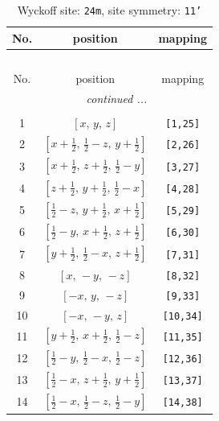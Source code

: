 \documentclass[fleqn,8pt]{jsarticle}
\begin{document}
\begin{longtable}{ccc}
\caption{Wyckoff site: {\tt 24m}, site symmetry: {\tt 11'}}
 \\
 \hline \hline
No. & position & mapping \\ \hline \endfirsthead

\multicolumn{2}{l}{\tablename\ \thetable{}} \\
 \hline \hline
No. & position & mapping \\ \hline \endhead

 \hline \hline
\multicolumn{2}{r}{\footnotesize\it continued ...} \\ \endfoot

 \hline \hline
\multicolumn{2}{r}{} \\ \endlastfoot

1 & $\left[ x,\, y,\, z \right]$ & {\tt [1,25]} \\ \hline
2 & $\left[ x + \frac{1}{2},\, \frac{1}{2} - z,\, y + \frac{1}{2} \right]$ & {\tt [2,26]} \\ \hline
3 & $\left[ x + \frac{1}{2},\, z + \frac{1}{2},\, \frac{1}{2} - y \right]$ & {\tt [3,27]} \\ \hline
4 & $\left[ z + \frac{1}{2},\, y + \frac{1}{2},\, \frac{1}{2} - x \right]$ & {\tt [4,28]} \\ \hline
5 & $\left[ \frac{1}{2} - z,\, y + \frac{1}{2},\, x + \frac{1}{2} \right]$ & {\tt [5,29]} \\ \hline
6 & $\left[ \frac{1}{2} - y,\, x + \frac{1}{2},\, z + \frac{1}{2} \right]$ & {\tt [6,30]} \\ \hline
7 & $\left[ y + \frac{1}{2},\, \frac{1}{2} - x,\, z + \frac{1}{2} \right]$ & {\tt [7,31]} \\ \hline
8 & $\left[ x,\, - y,\, - z \right]$ & {\tt [8,32]} \\ \hline
9 & $\left[ - x,\, y,\, - z \right]$ & {\tt [9,33]} \\ \hline
10 & $\left[ - x,\, - y,\, z \right]$ & {\tt [10,34]} \\ \hline
11 & $\left[ y + \frac{1}{2},\, x + \frac{1}{2},\, \frac{1}{2} - z \right]$ & {\tt [11,35]} \\ \hline
12 & $\left[ \frac{1}{2} - y,\, \frac{1}{2} - x,\, \frac{1}{2} - z \right]$ & {\tt [12,36]} \\ \hline
13 & $\left[ \frac{1}{2} - x,\, z + \frac{1}{2},\, y + \frac{1}{2} \right]$ & {\tt [13,37]} \\ \hline
14 & $\left[ \frac{1}{2} - x,\, \frac{1}{2} - z,\, \frac{1}{2} - y \right]$ & {\tt [14,38]} \\ \hline

\end{longtable}
\end{document}
